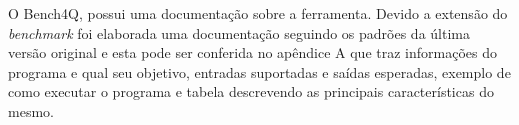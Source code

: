 O Bench4Q, possui uma documentação sobre a ferramenta. Devido a extensão do \textit{benchmark} foi elaborada uma documentação seguindo os padrões da última versão original e esta pode ser conferida no apêndice A que traz informações do programa e qual seu objetivo, entradas suportadas e saídas esperadas, exemplo de como executar o programa e tabela descrevendo as principais características do mesmo.